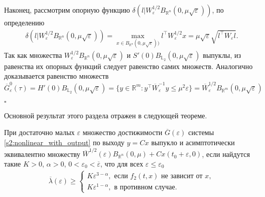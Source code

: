 \documentclass[../main.tex]{subfiles}
\begin{document}
Наконец, рассмотрим опорную функцию $\delta(l | W^{1/2}_{\varepsilon} B_{\mathbb{R}^n}(0,\mu\sqrt{\varepsilon}))$, по определению
\begin{gather*}
	\delta(l | W^{1/2}_{\varepsilon} B_{\mathbb{R}^n}(0,\mu\sqrt{\varepsilon})) = \max\limits_{x \in B_{\mathbb{R}^n}(0,\mu\sqrt{\varepsilon}))} l^{\top} W^{1/2}_{\varepsilon} x = \mu\sqrt{\varepsilon} \sqrt{l^{\top} W_{\varepsilon} l}.
\end{gather*}
Так как множества $W^{1/2}_{\varepsilon} B_{\mathbb{R}^n}(0,\mu\sqrt{\varepsilon}) $ и $S'(0) B_{\mathbb{L}_2}(0,\mu\sqrt{\varepsilon})$ выпуклы, из равенства их опорных функций следует равенство самих множеств. 
Аналогично доказывается равенство множеств $\overline{G}^0_{\varepsilon}(\tau) = H'(0) B_{\mathbb{L}_2}(0,\mu\sqrt{\varepsilon}) =  \{ y \in \mathbb{R}^m: y^{\top} \overline{W}^{-1}_{\varepsilon} y \leqslant \mu^2 \varepsilon \} = \overline{W}^{1/2}_{\varepsilon} B_{\mathbb{R}^m}(0,\mu\sqrt{\varepsilon})$

 \hfill $\square$
    
Основной результат этого раздела отражен в следующей теореме.
\begin{theorem}\label{s2:th:assimptotic_equality}
        При достаточно малых $ \varepsilon $ множество достижимости $ \overline{G}(\varepsilon) $ системы \eqref{s2:nonlinear_with_output} по выходу $ y = C x $ выпукло и асимптотически эквивалентно множеству $\overline{W}^{1/2}(\varepsilon)B_{\mathbb{R}^n}(0,\mu) + Cx(t_0+\varepsilon,0)$, если найдутся такие $ K>0 $, $ \alpha > 0 $, $ 0< \varepsilon_0<\overline{\varepsilon}  $, что для всех $ \varepsilon \leqslant \varepsilon_0 $
        \begin{gather}\label{cond1}
           \overline{\lambda}(\varepsilon) \geqslant \left\{ {\begin{array}{*{20}{l}}
                    {K\varepsilon ^{3 - \alpha}, \mbox{\ если \ } f_2(t,x) \mbox{\ не зависит от \ } x}, \\
                    {K\varepsilon ^{1 - \alpha}}, \mbox{\ в противном случае}.
            \end{array}} \right.
        \end{gather}
\end{theorem}
    
\end{document}
